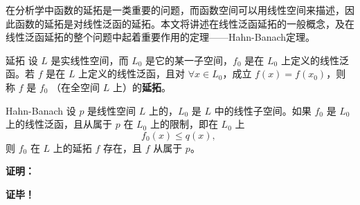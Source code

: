 
在分析学中函数的延拓是一类重要的问题，而函数空间可以用线性空间来描述，因此函数的延拓是对线性泛函的延拓。本文将讲述在线性泛函延拓的一般概念，及在线性泛函延拓的整个问题中起着重要作用的定理——Hahn-Banach定理。

\begin{definition}{延拓}
设 $L$ 是实线性空间，而 $L_0$ 是它的某一子空间，$f_0$ 是在 $L_0$ 上定义的线性泛函。若 $f$ 是在 $L$ 上定义的线性泛函，且对 $\forall x\in L_0$，成立 $f(x)=f(x_0)$，则称 $f$ 是 $f_0$ （在全空间 $L$ 上）的\textbf{延拓}。
\end{definition}


\begin{theorem}{Hahn-Banach}
设 $p$ 是线性空间 $L$ 上的，$L_0$ 是 $L$ 中的线性子空间。如果 $f_0$ 是 $L_0$ 上的线性泛函，且从属于 $p$ 在 $L_0$ 上的限制，即在 $L_0$ 上
\begin{equation}
f_0(x)\leq q(x),~
\end{equation}
则 $f_0$ 在 $L$ 上的延拓 $f$ 存在，且 $f$ 从属于 $p$。
\end{theorem}

\textbf{证明：}



\textbf{证毕！}



